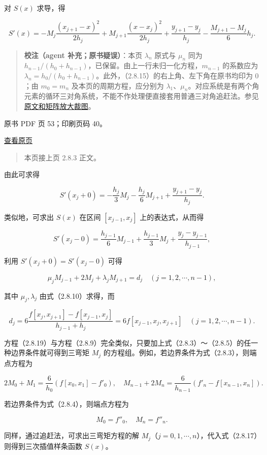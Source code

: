 对 \(S(x)\) 求导，得

\[S'(x)=-M_j\frac{(x_{j+1}-x)^2}{2h_j}+M_{j+1}\frac{(x-x_j)^2}{2h_j}+\frac{y_{j+1}-y_j}{h_j}-\frac{M_{j+1}-M_j}6h_j.\tag{2.8.18}\]

\begin{quote}
\textbf{校注（agent 补充；原书疑误）}：本页 \(\lambda_n\) 原式与 \(\mu_n\) 同为 \(h_{n-1}/(h_0+h_{n-1})\)，已保留。由上一行未归一化方程，\(m_{n-1}\) 的系数应为 \(\lambda_n=h_0/(h_0+h_{n-1})\)。此外，（2.8.15）的右上角、左下角在原书均印为 \(0\)；由 \(m_0=m_n\) 及本页的周期方程，应分别为 \(\lambda_1\)、\(\mu_n\)。对应系统是有两个角元素的循环三对角系统，不能不作处理便直接套用普通三对角追赶法。参见\href{verified/assets/ch02b/pdf-052-periodic-system-detail.png}{原文和矩阵放大裁图}。
\end{quote}

\clearpage

原书 PDF 页 53；印刷页码 40。

\href{source-images/pdf-053.jpeg}{查看原页}

\begin{quote}
本页接上页 2.8.3 正文。
\end{quote}

由此可求得

\[S'(x_j+0)=-\frac{h_j}3M_j-\frac{h_j}6M_{j+1}+\frac{y_{j+1}-y_j}{h_j}.\]

类似地，可求出 \(S(x)\) 在区间 \([x_{j-1},x_j]\) 上的表达式，从而得

\[S'(x_j-0)=\frac{h_{j-1}}6M_{j-1}+\frac{h_{j-1}}3M_j+\frac{y_j-y_{j-1}}{h_{j-1}},\]

利用 \(S'(x_j+0)=S'(x_j-0)\) 可得

\[\mu_jM_{j-1}+2M_j+\lambda_jM_{j+1}=d_j\quad(j=1,2,\cdots,n-1),\tag{2.8.19}\]

其中 \(\mu_j,\lambda_j\) 由式（2.8.10）求得，而

\[d_j=6\frac{f[x_j,x_{j+1}]-f[x_{j-1},x_j]}{h_{j-1}+h_j}=6f[x_{j-1},x_j,x_{j+1}]\quad(j=1,2,\cdots,n-1).\tag{2.8.20}\]

方程（2.8.19）与方程（2.8.9）完全类似，只要加上式（2.8.3）～（2.8.5）的任一种边界条件就可得到三弯矩 \(M_j\) 的方程组。例如，若边界条件为式（2.8.3），则端点方程为

\[2M_0+M_1=\frac6{h_0}(f[x_0,x_1]-f'_0),\quad M_{n-1}+2M_n=\frac6{h_{n-1}}(f'_n-f[x_{n-1},x_n]).\]

若边界条件为式（2.8.4），则端点方程为

\[M_0=f''_0,\quad M_n=f''_n.\]

同样，通过追赶法，可求出三弯矩方程的解 \(M_j\)（\(j=0,1,\cdots,n\)），代入式（2.8.17）则得到三次插值样条函数 \(S(x)\)。

